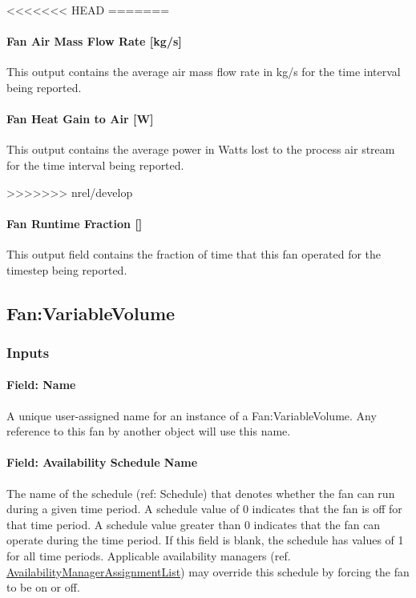 <<<<<<< HEAD
=======
\paragraph{Fan Air Mass Flow Rate {[}kg/s{]}}\label{fan-air-mass-flow-kgs-1}

This output contains the average air mass flow rate in kg/s for the time interval being reported.

\paragraph{Fan Heat Gain to Air {[}W{]}}\label{fan-heat-gain-to-air-w-1}

This output contains the average power in Watts lost to the process air stream for the time interval being reported.

>>>>>>> nrel/develop
\paragraph{Fan Runtime Fraction {[]}}\label{fan-runtime-fraction}

This output field contains the fraction of time that this fan operated for the timestep being reported.

\subsection{Fan:VariableVolume}\label{fanvariablevolume}

\subsubsection{Inputs}\label{inputs-2-016}

\paragraph{Field: Name}\label{field-name-2-015}

A unique user-assigned name for an instance of a Fan:VariableVolume. Any reference to this fan by another object will use this name.

\paragraph{Field: Availability Schedule Name}\label{field-availability-schedule-name-2-002}

The name of the schedule (ref: Schedule) that denotes whether the fan can run during a given time period. A schedule value of 0 indicates that the fan is off for that time period. A schedule value greater than 0 indicates that the fan can operate during the time period. If this field is blank, the schedule has values of 1 for all time periods. Applicable availability managers (ref. \hyperref[availabilitymanagerassignmentlist]{AvailabilityManagerAssignmentList}) may override this schedule by forcing the fan to be on or off.

